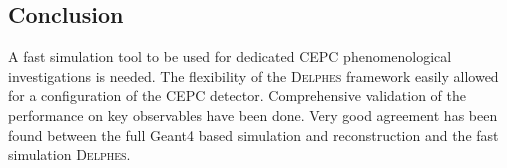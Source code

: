 \documentclass[a4paper,10pt,twoside]{cpc-hepnp}
\begin{document}
\begin{multicols}{2}
\section{Conclusion\label{sec:conclusion}}

A fast simulation tool to be used for dedicated CEPC phenomenological investigations is needed. 
The flexibility of the {\textsc{Delphes}} framework easily allowed for a configuration of the CEPC detector. 
Comprehensive validation of the performance on key observables have been done. 
Very good agreement has been found between the full Geant4 based simulation and reconstruction and the fast simulation {\textsc{Delphes}}. 


\vspace{3mm}

\begin{thebibliography}{90}

\vspace{3mm}


\end{thebibliography}
\end{multicols}
\end{document}
